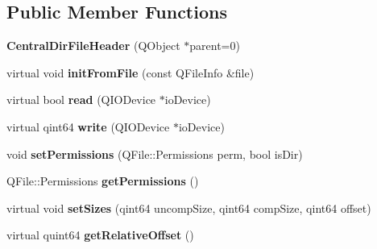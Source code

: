 \subsection*{Public Member Functions}
\begin{DoxyCompactItemize}
\item 
{\bfseries Central\+Dir\+File\+Header} (Q\+Object $\ast$parent=0)\hypertarget{class_central_dir_file_header_a936a94fc3dc92bd5757f490e16d5a7d2}{}\label{class_central_dir_file_header_a936a94fc3dc92bd5757f490e16d5a7d2}

\item 
virtual void {\bfseries init\+From\+File} (const Q\+File\+Info \&file)\hypertarget{class_central_dir_file_header_aa6f76dcbb002b69247ca1c2b1a6e733d}{}\label{class_central_dir_file_header_aa6f76dcbb002b69247ca1c2b1a6e733d}

\item 
virtual bool {\bfseries read} (Q\+I\+O\+Device $\ast$io\+Device)\hypertarget{class_central_dir_file_header_aa2de28fb3fbd63c69b9d4041d77f7e67}{}\label{class_central_dir_file_header_aa2de28fb3fbd63c69b9d4041d77f7e67}

\item 
virtual qint64 {\bfseries write} (Q\+I\+O\+Device $\ast$io\+Device)\hypertarget{class_central_dir_file_header_a953bac15dceb1fdb7f82856354fe77fd}{}\label{class_central_dir_file_header_a953bac15dceb1fdb7f82856354fe77fd}

\item 
void {\bfseries set\+Permissions} (Q\+File\+::\+Permissions perm, bool is\+Dir)\hypertarget{class_central_dir_file_header_af151ff82537933da3b329b6b76f47027}{}\label{class_central_dir_file_header_af151ff82537933da3b329b6b76f47027}

\item 
Q\+File\+::\+Permissions {\bfseries get\+Permissions} ()\hypertarget{class_central_dir_file_header_a072070fd1e9e189c8feeea1fab24d8fc}{}\label{class_central_dir_file_header_a072070fd1e9e189c8feeea1fab24d8fc}

\item 
virtual void {\bfseries set\+Sizes} (qint64 uncomp\+Size, qint64 comp\+Size, qint64 offset)\hypertarget{class_central_dir_file_header_a1daced3f8b961a0b73a2e554ab908d95}{}\label{class_central_dir_file_header_a1daced3f8b961a0b73a2e554ab908d95}

\item 
virtual quint64 {\bfseries get\+Relative\+Offset} ()\hypertarget{class_central_dir_file_header_adcfbe672c809b8efea26b79af3d6b3ac}{}\label{class_central_dir_file_header_adcfbe672c809b8efea26b79af3d6b3ac}


\end{DoxyCompactItemize}
